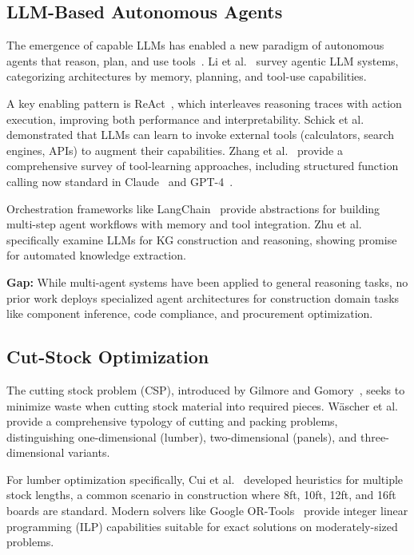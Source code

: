 \subsection{LLM-Based Autonomous Agents}

The emergence of capable LLMs has enabled a new paradigm of autonomous agents that reason, plan, and use tools~\cite{wang2024agents_survey, xi2023agents_rise}.
Li et al.~\cite{li2025agentic_survey} survey agentic LLM systems, categorizing architectures by memory, planning, and tool-use capabilities.

A key enabling pattern is ReAct~\cite{yao2023react}, which interleaves reasoning traces with action execution, improving both performance and interpretability.
Schick et al.~\cite{schick2023toolformer} demonstrated that LLMs can learn to invoke external tools (calculators, search engines, APIs) to augment their capabilities.
Zhang et al.~\cite{zhang2025tool_learning} provide a comprehensive survey of tool-learning approaches, including structured function calling now standard in Claude~\cite{anthropic2024claude} and GPT-4~\cite{openai2024gpt4}.

Orchestration frameworks like LangChain~\cite{chase2022langchain} provide abstractions for building multi-step agent workflows with memory and tool integration.
Zhu et al.~\cite{zhu2024llm_kg_construction} specifically examine LLMs for KG construction and reasoning, showing promise for automated knowledge extraction.

\textbf{Gap:} While multi-agent systems have been applied to general reasoning tasks, no prior work deploys specialized agent architectures for construction domain tasks like component inference, code compliance, and procurement optimization.

\subsection{Cut-Stock Optimization}

The cutting stock problem (CSP), introduced by Gilmore and Gomory~\cite{gilmore1961cutting}, seeks to minimize waste when cutting stock material into required pieces.
Wäscher et al.~\cite{wascher2007csp_survey} provide a comprehensive typology of cutting and packing problems, distinguishing one-dimensional (lumber), two-dimensional (panels), and three-dimensional variants.

For lumber optimization specifically, Cui et al.~\cite{cui2017lumber_optimization} developed heuristics for multiple stock lengths, a common scenario in construction where 8ft, 10ft, 12ft, and 16ft boards are standard.
Modern solvers like Google OR-Tools~\cite{ortools2024} provide integer linear programming (ILP) capabilities suitable for exact solutions on moderately-sized problems.

